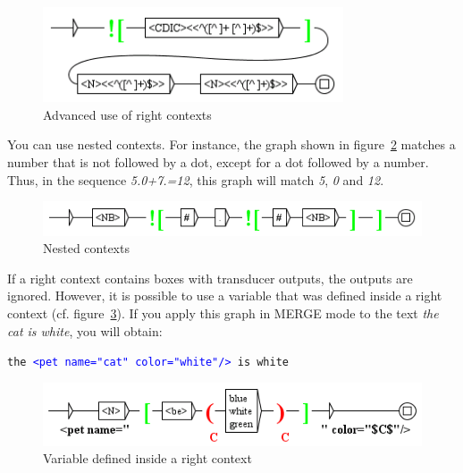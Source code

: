 \bigskip
\begin{figure}[!h]
\begin{center}
\includegraphics[width=8.9cm]{resources/img/fig6-15.png}
\caption{Advanced use of right contexts\label{fig-context4}}
\end{center}
\end{figure}

\bigskip
\noindent You can use nested contexts. For instance, the graph shown in
figure~\ref{fig-context5} matches a number that is not followed by a dot, except
for a dot followed by a number. Thus, in the sequence \textit{5.0+7.=12}, this graph
will match \textit{5}, \textit{0} and \textit{12}.

\bigskip
\begin{figure}[!h]
\begin{center}
\includegraphics[width=12cm]{resources/img/fig6-16.png}
\caption{Nested contexts\label{fig-context5}}
\end{center}
\end{figure}

\bigskip
\noindent If a right context contains boxes with transducer outputs, the
outputs are ignored. However, it is possible to use a variable that was defined inside a
right context (cf. figure~\ref{fig-context6}). If you apply this graph in MERGE
mode to the text \textit{the cat is white}, you will obtain:

\bigskip
\texttt{the \textcolor{blue}{<pet name="cat" color="white"/>} is white}

\bigskip

\begin{figure}[!h]
\begin{center}
\includegraphics[width=12.2cm]{resources/img/fig6-17.png}
\caption{Variable defined inside a right context\label{fig-context6}}
\end{center}
\end{figure}

